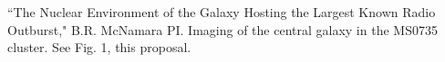 \documentclass[12pt]{article}
\begin{document}

%
%
\specialreq             %


%
%
\coordinatedobs          %


%
%
\duplications           %



%
%
\pasthstusage  %
``The Nuclear Environment of the Galaxy Hosting the Largest Known Radio Outburst," B.R. McNamara PI.  Imaging of the central galaxy in the MS0735
cluster.  See Fig. 1, this proposal.
\end{document}
